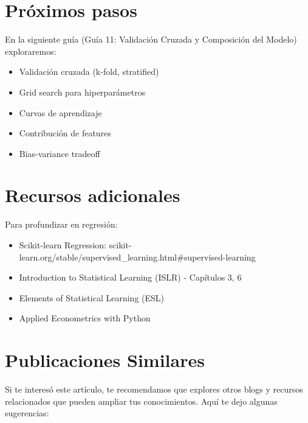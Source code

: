 \documentclass[
  doc,
  floatsintext,
  longtable,
  a4paper,
  nolmodern,
  notxfonts,
  notimes,
  12pt,
  colorlinks=true,linkcolor=blue,citecolor=blue,urlcolor=blue]{apa7}
\providecommand{\tightlist}{%
  \setlength{\itemsep}{0pt}\setlength{\parskip}{0pt}}
\begin{document}
\section{Próximos pasos}\label{pruxf3ximos-pasos}

En la siguiente guía (Guía 11: Validación Cruzada y Composición del
Modelo) exploraremos:

\begin{itemize}
\tightlist
\item
  Validación cruzada (k-fold, stratified)
\item
  Grid search para hiperparámetros
\item
  Curvas de aprendizaje
\item
  Contribución de features
\item
  Bias-variance tradeoff
\end{itemize}

\section{Recursos adicionales}\label{recursos-adicionales}

Para profundizar en regresión:

\begin{itemize}
\tightlist
\item
  Scikit-learn Regression:
  scikit-learn.org/stable/supervised\_learning.html\#supervised-learning
\item
  Introduction to Statistical Learning (ISLR) - Capítulos 3, 6
\item
  Elements of Statistical Learning (ESL)
\item
  Applied Econometrics with Python
\end{itemize}

\section{Publicaciones Similares}\label{publicaciones-similares}

Si te interesó este artículo, te recomendamos que explores otros blogs y
recursos relacionados que pueden ampliar tus conocimientos. Aquí te dejo
algunas sugerencias:
\end{document}
